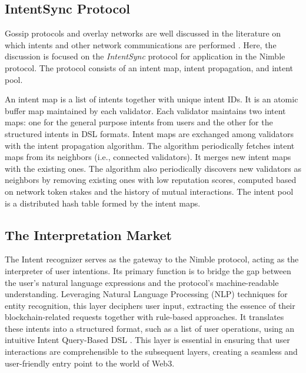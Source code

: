 \documentclass[11pt,letterpaper,twocolumn]{article}
\begin{document}
\subsection{IntentSync Protocol}
Gossip protocols and overlay networks are well discussed in the literature on which
intents and other network communications are performed \cite{kaashoek2003koorde, ren2010topbt, zhao2005gridmedia, small2006scaling, dabek2005distributed, jin2011network}. Here, the discussion is focused on the \emph{IntentSync} protocol for application in the Nimble protocol. The
protocol consists of an intent map, intent propagation, and intent pool.

An intent map is a list of intents together with unique intent IDs. It is an atomic buffer
map maintained by each validator. Each validator maintains two intent maps: one for the
general purpose intents from users and the other for the structured intents in DSL formats.
Intent maps are exchanged among validators with the intent propagation algorithm. The
algorithm periodically fetches intent maps from its neighbors (i.e., connected validators).
It merges new intent maps with the existing ones. The algorithm also periodically discovers
new validators as neighbors by removing existing ones with low reputation scores,
computed based on network token stakes and the history of mutual interactions.
The intent pool is a distributed hash table formed by the intent maps.

\subsection{The Interpretation Market}
The Intent recognizer serves as the gateway to the Nimble protocol, acting as the interpreter of user intentions. Its primary function is to bridge the gap between the user's natural language expressions and the protocol's machine-readable understanding. Leveraging Natural Language Processing (NLP) techniques for entity recognition, this layer deciphers user input, extracting the essence of their blockchain-related requests together with rule-based approaches. It translates these intents into a structured format, such as a list of user operations, using an intuitive Intent Query-Based DSL \cite{mernik2005and, kosar2008preliminary, fowler2010domain, hudak1997domain, selic2007systematic}. This layer is essential in ensuring that user interactions are comprehensible to the subsequent layers, creating a seamless and user-friendly entry point to the world of Web3.
\end{document}
